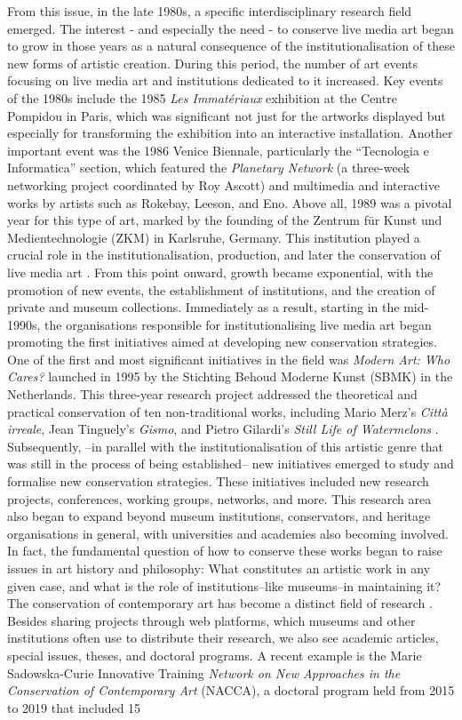 From this issue, in the late 1980s, a specific interdisciplinary research field emerged. The interest - and especially the need - to conserve live media art began to grow in those years as a natural consequence of the institutionalisation of these new forms of artistic creation. During this period, the number of art events focusing on live media art and institutions dedicated to it increased. Key events of the 1980s include the 1985 \textit{Les Immatériaux} exhibition at the Centre Pompidou in Paris, which was significant not just for the artworks displayed but especially for transforming the exhibition into an interactive installation. Another important event was the 1986 Venice Biennale, particularly the ``Tecnologia e Informatica'' section, which featured the \textit{Planetary Network} (a three-week networking project coordinated by Roy Ascott) and multimedia and interactive works by artists such as Rokebay, Leeson, and Eno. Above all, 1989 was a pivotal year for this type of art, marked by the founding of the Zentrum für Kunst und Medientechnologie (ZKM) in Karlsruhe, Germany. This institution played a crucial role in the institutionalisation, production, and later the conservation of live media art \cite{quaranta2013beyond}. From this point onward, growth became exponential, with the promotion of new events, the establishment of institutions, and the creation of private and museum collections. Immediately as a result, starting in the mid-1990s, the organisations responsible for institutionalising live media art began promoting the first initiatives aimed at developing new conservation strategies. One of the first and most significant initiatives in the field was \textit{Modern Art: Who Cares?} launched in 1995 by the Stichting Behoud Moderne Kunst (SBMK) in the Netherlands. This three-year research project addressed the theoretical and practical conservation of ten non-traditional works, including Mario Merz's \textit{Città irreale}, Jean Tinguely's \textit{Gismo}, and Pietro Gilardi's \textit{Still Life of Watermelons} \cite{van2024conservation}. Subsequently, –in parallel with the institutionalisation of this artistic genre that was still in the process of being established– new initiatives emerged to study and formalise new conservation strategies. These initiatives included new research projects, conferences, working groups, networks, and more. This research area also began to expand beyond museum institutions, conservators, and heritage organisations in general, with universities and academies also becoming involved. In fact, the fundamental question of how to conserve these works began to raise issues in art history and philosophy: What constitutes an artistic work in any given case, and what is the role of institutions–like museums–in maintaining it? The conservation of contemporary art has become a distinct field of research \cite{laurenson2022bridging}. Besides sharing projects through web platforms, which museums and other institutions often use to distribute their research, we also see academic articles, special issues, theses, and doctoral programs. A recent example is the Marie Sadowska-Curie Innovative Training \textit{Network on New Approaches in the Conservation of Contemporary Art} (NACCA), a doctoral program held from 2015 to 2019 that included 15 